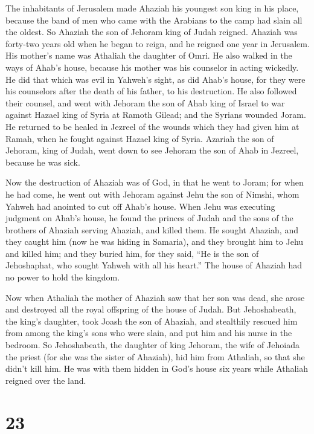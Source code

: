  The inhabitants of Jerusalem made Ahaziah his youngest
son king in his place, because the band of men who came with the
Arabians to the camp had slain all the oldest. So Ahaziah the son of
Jehoram king of Judah reigned.  Ahaziah was forty-two
years old when he began to reign, and he reigned one year in Jerusalem.
His mother's name was Athaliah the daughter of Omri.  He
also walked in the ways of Ahab's house, because his mother was his
counselor in acting wickedly.  He did that which was evil
in Yahweh's sight, as did Ahab's house, for they were his counselors
after the death of his father, to his destruction.  He
also followed their counsel, and went with Jehoram the son of Ahab king
of Israel to war against Hazael king of Syria at Ramoth Gilead; and the
Syrians wounded Joram.  He returned to be healed in
Jezreel of the wounds which they had given him at Ramah, when he fought
against Hazael king of Syria. Azariah the son of Jehoram, king of Judah,
went down to see Jehoram the son of Ahab in Jezreel, because he was
sick.

 Now the destruction of Ahaziah was of God, in that he
went to Joram; for when he had come, he went out with Jehoram against
Jehu the son of Nimshi, whom Yahweh had anointed to cut off Ahab's
house.  When Jehu was executing judgment on Ahab's house,
he found the princes of Judah and the sons of the brothers of Ahaziah
serving Ahaziah, and killed them.  He sought Ahaziah, and
they caught him (now he was hiding in Samaria), and they brought him to
Jehu and killed him; and they buried him, for they said, ``He is the son
of Jehoshaphat, who sought Yahweh with all his heart.'' The house of
Ahaziah had no power to hold the kingdom.

 Now when Athaliah the mother of Ahaziah saw that her son
was dead, she arose and destroyed all the royal offspring of the house
of Judah.  But Jehoshabeath, the king's daughter, took
Joash the son of Ahaziah, and stealthily rescued him from among the
king's sons who were slain, and put him and his nurse in the bedroom. So
Jehoshabeath, the daughter of king Jehoram, the wife of Jehoiada the
priest (for she was the sister of Ahaziah), hid him from Athaliah, so
that she didn't kill him.  He was with them hidden in
God's house six years while Athaliah reigned over the land.

\hypertarget{section-22}{%
\section{23}\label{section-22}}

